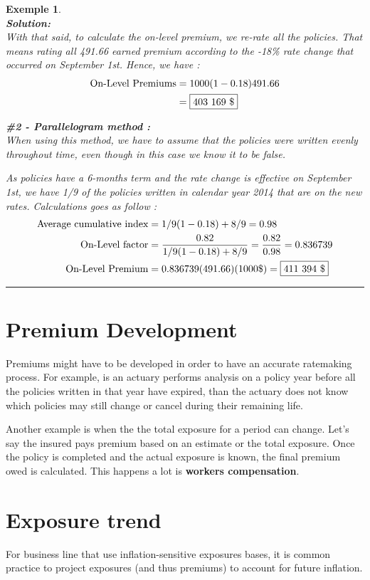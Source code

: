 \documentclass[11pt, english]{memoir}
\numberwithin{definition}{section}
\newtheorem{example}{Exemple}[section]
\newenvironment{exemple}
{
	\begin{example} \normalfont \ \\[5pt] 
	}
	{
		\hfill\rule{0.5em}{0.5em}\end{example}
}
\newenvironment{solution}
{\noindent\textbf{Solution:} \\[5pt] 
}{
}
\begin{document}
\begin{exemple}
\begin{solution}
			With that said, to calculate the on-level premium, we re-rate all the policies. That means rating all 491.66 earned premium according to the -18\% rate change that occurred on September 1st. Hence, we have : 
			\begin{align*}
			\text{On-Level Premiums} &= 1000(1-0.18)491.66\\
			&=\fbox{403 169 \$}
			\end{align*} 
			
		\textbf{\#2 - Parallelogram method : } \\[0pt]
			When using this method, we have to assume that the policies were written evenly throughout time, even though in this case we know it to be false. 
			
			As policies have a 6-months term and the rate change is effective on September 1st, we have 1/9 of the policies written in calendar year 2014 that are on the new rates. Calculations goes as follow : 
			\begin{align*}
			\text{Average cumulative index} &= 1/9(1-0.18) + 8/9 = 0.98\\
			\text{On-Level factor} &= \frac{0.82}{1/9(1-0.18) + 8/9} = \frac{0.82}{0.98} = 0.836739\\
			\text{On-Level Premium} &= 0.836739(491.66)(1000\$) = \fbox{411 394 \$}
			\end{align*}
	\end{solution}
	\end{exemple}
	
	\section{Premium Development}
	Premiums might have to be developed in order to have an accurate ratemaking process. For example, is an actuary performs analysis on a policy year before all the policies written in that year have expired, than the actuary does not know which policies may still change or cancel during their remaining life. 
	
	Another example is when the the total exposure for a period can change. Let's say the insured pays premium based on an estimate or the total exposure. Once the policy is completed and the actual exposure is known, the final premium owed is calculated. This happens a lot is \textbf{workers compensation}. 
	
	\section{Exposure trend}
	For business line that use inflation-sensitive exposures bases, it is common practice to project exposures (and thus premiums) to account for future inflation. 
	
\end{document}
